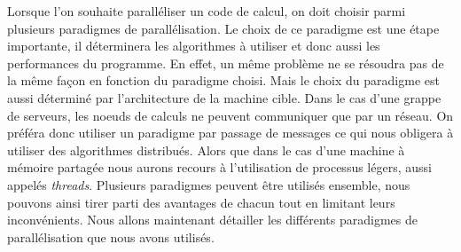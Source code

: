 Lorsque l'on souhaite paralléliser un code de calcul, on doit choisir parmi plusieurs paradigmes de parallélisation.
%
Le choix de ce paradigme est une étape importante, il déterminera les algorithmes à utiliser et donc aussi les performances du programme.
%
En effet, un même problème ne se résoudra pas de la même façon en fonction du paradigme choisi.
%
Mais le choix du paradigme est aussi déterminé par l'architecture de la machine cible.
%
Dans le cas d'une grappe de serveurs, les noeuds de calculs ne peuvent communiquer que par un réseau.
%
On préféra donc utiliser un paradigme par passage de messages ce qui nous obligera à utiliser des algorithmes distribués.
%
Alors que dans le cas d'une machine à mémoire partagée nous aurons recours à l'utilisation de processus légers, aussi appelés {\em threads}.
%
Plusieurs paradigmes peuvent être utilisés ensemble, nous pouvons ainsi tirer parti des avantages de chacun tout en limitant leurs inconvénients.
%
Nous allons maintenant détailler les différents paradigmes de parallélisation que nous avons utilisés.
